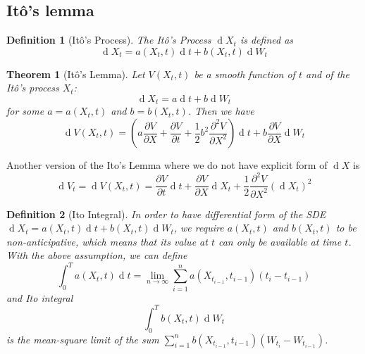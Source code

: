 \documentclass[12pt]{article}
\newtheorem{definition}{Definition}[section]
\newtheorem{theorem}{Theorem}[section]
\theoremstyle{definition}
\DeclareMathOperator{\diff}{d}
\begin{document}
\subsection{It\^{o}'s lemma}
\begin{definition}[It\^{o}'s Process]
\normalfont The It\^{o}'s Process $\diff X_t$ is defined as 
\[
\diff X_t = a(X_t,t)\diff t + b(X_t,t)\diff W_t
\]
\end{definition}
\begin{theorem}[It\^{o}'s Lemma]
\normalfont Let $V(X_t,t)$ be a smooth function of $t$ and of the It\^{o}'s process $X_t$:
\[
\diff X_t = a\diff t + b\diff W_t
\]
for some $a=a(X_t,t)$ and $b=b(X_t,t)$. Then we have
\[
\diff V(X_t,t) = (a\frac{\partial V}{\partial X}+\frac{\partial V}{\partial t}+\frac{1}{2}b^2\frac{\partial^2 V}{\partial X^2})\diff t+b\frac{\partial V}{\partial X}\diff W_t
\]
\end{theorem}
Another version of the Ito's Lemma where we do not have explicit form of $\diff X$ is
\[
\diff V_t = \diff V(X_t,t) = \frac{\partial V}{\partial t}\diff t+\frac{\partial V}{\partial X}\diff X_t + \frac{1}{2}\frac{\partial^2 V}{\partial X^2}(\diff X_t)^2 
\]
\begin{definition}[Ito Integral]
\normalfont In order to have differential form of the SDE $\diff X_t = a(X_t,t)\diff t+b(X_t,t)\diff W_t$, we require $a(X_t,t)$ and $b(X_t,t)$ to be non-anticipative, which means that its value at $t$ can only be available at time $t$.\\
With the above assumption, we can define
\[
\int_0^T a(X_t,t)\diff t = \lim_{n\to \infty}\sum_{i=1}^n a(X_{t_{i-1}}, t_{i-1})(t_i-t_{i-1})
\]
and Ito integral
\[
\int_0^T b(X_t,t)\diff W_t
\]
is the mean-square limit of the sum $\sum_{i=1}^n b(X_{t_{i-1}}, t_{i-1})(W_{t_i}-W_{t_{i-1}})$.
\end{definition}
\end{document}
